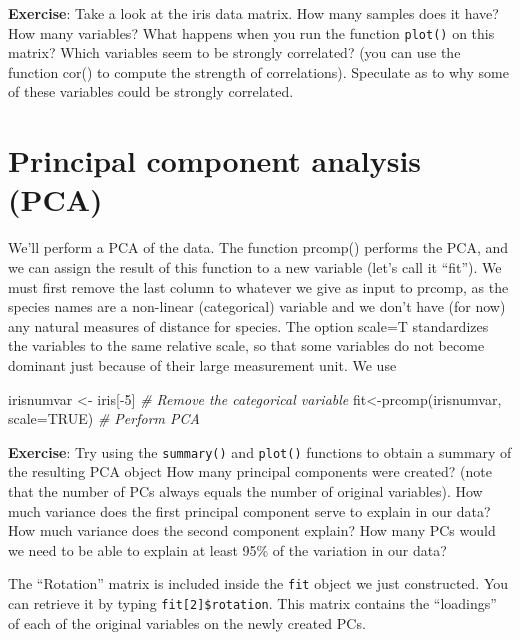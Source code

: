 \documentclass[
]{book}
\newenvironment{Shaded}{\begin{snugshade}}{\end{snugshade}}
\newcommand{\AttributeTok}[1]{\textcolor[rgb]{0.77,0.63,0.00}{#1}}
\newcommand{\CommentTok}[1]{\textcolor[rgb]{0.56,0.35,0.01}{\textit{#1}}}
\newcommand{\ConstantTok}[1]{\textcolor[rgb]{0.00,0.00,0.00}{#1}}
\newcommand{\DecValTok}[1]{\textcolor[rgb]{0.00,0.00,0.81}{#1}}
\newcommand{\FunctionTok}[1]{\textcolor[rgb]{0.00,0.00,0.00}{#1}}
\newcommand{\NormalTok}[1]{#1}
\newcommand{\OtherTok}[1]{\textcolor[rgb]{0.56,0.35,0.01}{#1}}
\newcommand{\SpecialCharTok}[1]{\textcolor[rgb]{0.00,0.00,0.00}{#1}}
\begin{document}
\textbf{Exercise}: Take a look at the iris data matrix. How many samples does it have? How many variables? What happens when you run the function \texttt{plot()} on this matrix? Which variables seem to be strongly correlated? (you can use the function cor() to compute the strength of correlations). Speculate as to why some of these variables could be strongly correlated.

\hypertarget{principal-component-analysis-pca}{%
\section{Principal component analysis (PCA)}\label{principal-component-analysis-pca}}

We'll perform a PCA of the data. The function prcomp() performs the PCA, and we can assign the result of this function to a new variable (let's call it ``fit''). We must first remove the last column to whatever we give as input to prcomp, as the species names are a non-linear (categorical) variable and we don't have (for now) any natural measures of distance for species. The option scale=T standardizes the variables to the same relative scale, so that some variables do not become dominant just because of their large measurement unit. We use

\begin{Shaded}
\begin{Highlighting}[]
\NormalTok{irisnumvar }\OtherTok{\textless{}{-}}\NormalTok{ iris[}\SpecialCharTok{{-}}\DecValTok{5}\NormalTok{] }\CommentTok{\# Remove the categorical variable}
\NormalTok{fit}\OtherTok{\textless{}{-}}\FunctionTok{prcomp}\NormalTok{(irisnumvar, }\AttributeTok{scale=}\ConstantTok{TRUE}\NormalTok{) }\CommentTok{\# Perform PCA}
\end{Highlighting}
\end{Shaded}

\textbf{Exercise}: Try using the \texttt{summary()} and \texttt{plot()} functions to obtain a summary of the resulting PCA object How many principal components were created? (note that the number of PCs always equals the number of original variables). How much variance does the first principal component serve to explain in our data? How much variance does the second component explain? How many PCs would we need to be able to explain at least 95\% of the variation in our data?

The ``Rotation'' matrix is included inside the \texttt{fit} object we just constructed. You can retrieve it by typing \texttt{fit{[}2{]}\$rotation}. This matrix contains the ``loadings'' of each of the original variables on the newly created PCs.
\end{document}
